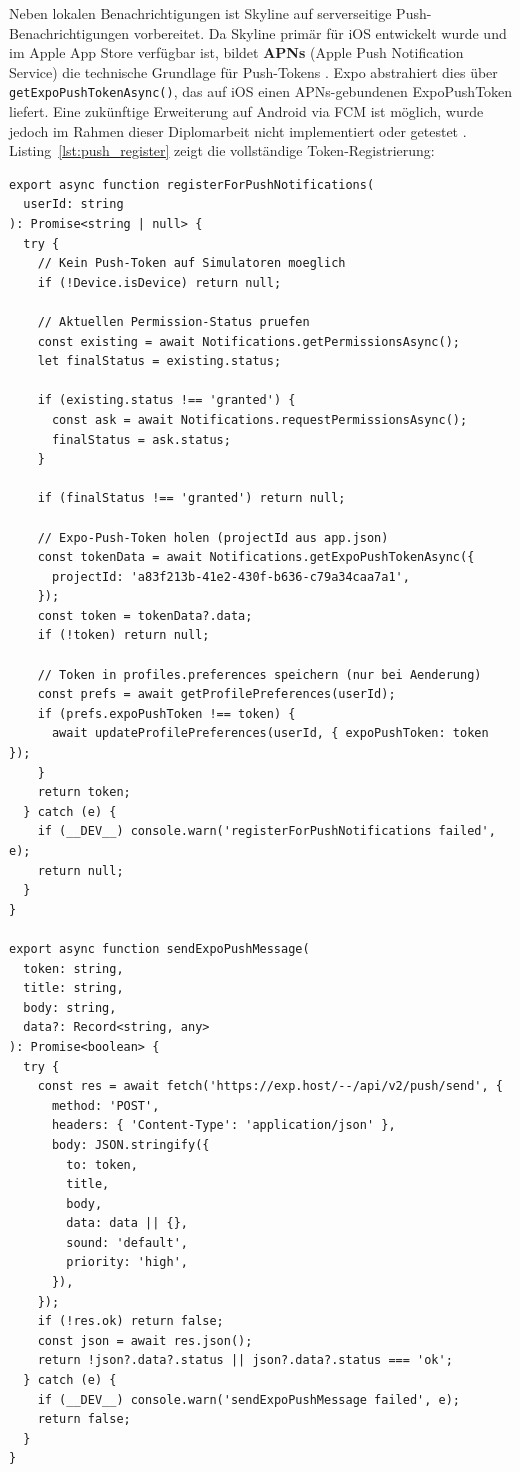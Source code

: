 Neben lokalen Benachrichtigungen ist Skyline auf serverseitige Push-Benachrichtigungen
vorbereitet.
Da Skyline primär für iOS entwickelt wurde und im Apple App Store verfügbar ist, bildet
\textbf{APNs} (Apple Push Notification Service) die technische Grundlage für Push-Tokens
\cite{appleLocalNotif,expoPushSetup}.
Expo abstrahiert dies über \texttt{getExpoPushTokenAsync()}, das auf iOS einen
APNs-gebundenen ExpoPushToken liefert.
Eine zukünftige Erweiterung auf Android via FCM ist möglich, wurde jedoch im Rahmen
dieser Diplomarbeit nicht implementiert oder getestet \cite{expoSendFcmApns}.
Listing~\ref{lst:push_register} zeigt die vollständige Token-Registrierung:

\begin{lstlisting}[style=skyline-ts,
  caption={Vollstaendige Token-Registrierung und Profil-Speicherung
           (services/pushNotificationsService.ts)},
  label={lst:push_register}]
export async function registerForPushNotifications(
  userId: string
): Promise<string | null> {
  try {
    // Kein Push-Token auf Simulatoren moeglich
    if (!Device.isDevice) return null;

    // Aktuellen Permission-Status pruefen
    const existing = await Notifications.getPermissionsAsync();
    let finalStatus = existing.status;

    if (existing.status !== 'granted') {
      const ask = await Notifications.requestPermissionsAsync();
      finalStatus = ask.status;
    }

    if (finalStatus !== 'granted') return null;

    // Expo-Push-Token holen (projectId aus app.json)
    const tokenData = await Notifications.getExpoPushTokenAsync({
      projectId: 'a83f213b-41e2-430f-b636-c79a34caa7a1',
    });
    const token = tokenData?.data;
    if (!token) return null;

    // Token in profiles.preferences speichern (nur bei Aenderung)
    const prefs = await getProfilePreferences(userId);
    if (prefs.expoPushToken !== token) {
      await updateProfilePreferences(userId, { expoPushToken: token });
    }
    return token;
  } catch (e) {
    if (__DEV__) console.warn('registerForPushNotifications failed', e);
    return null;
  }
}

export async function sendExpoPushMessage(
  token: string,
  title: string,
  body: string,
  data?: Record<string, any>
): Promise<boolean> {
  try {
    const res = await fetch('https://exp.host/--/api/v2/push/send', {
      method: 'POST',
      headers: { 'Content-Type': 'application/json' },
      body: JSON.stringify({
        to: token,
        title,
        body,
        data: data || {},
        sound: 'default',
        priority: 'high',
      }),
    });
    if (!res.ok) return false;
    const json = await res.json();
    return !json?.data?.status || json?.data?.status === 'ok';
  } catch (e) {
    if (__DEV__) console.warn('sendExpoPushMessage failed', e);
    return false;
  }
}
\end{lstlisting}

